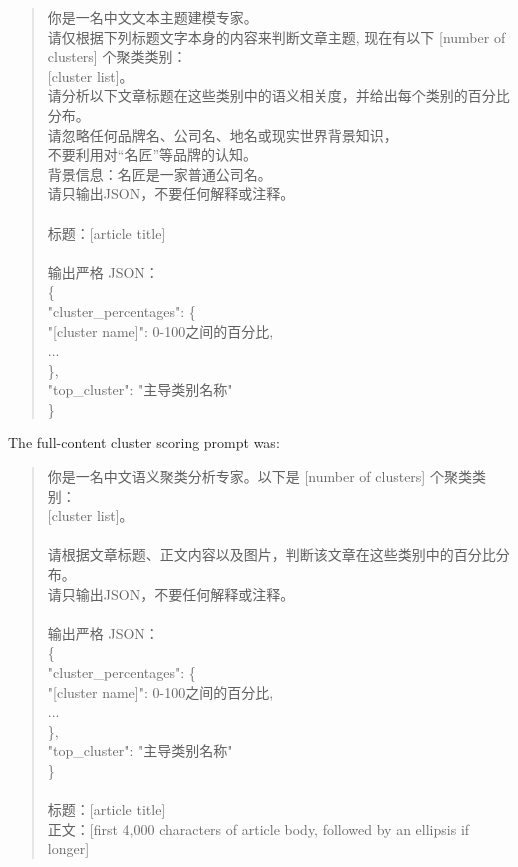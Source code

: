 \begin{quote}
\small
{}
{\cjkfont
你是一名中文文本主题建模专家。\\
请仅根据下列标题文字本身的内容来判断文章主题, 现在有以下 [number of clusters] 个聚类类别：\\
{[cluster list]}。\\
请分析以下文章标题在这些类别中的语义相关度，并给出每个类别的百分比分布。\\
请忽略任何品牌名、公司名、地名或现实世界背景知识，\\
不要利用对“名匠”等品牌的认知。\\
背景信息：名匠是一家普通公司名。\\
请只输出JSON，不要任何解释或注释。\\
\\
标题：[article title]\\
\\
输出严格 JSON：\\
\{\\
\quad "cluster\_percentages": \{\\
\quad\quad "[cluster name]": 0-100之间的百分比,\\
\quad\quad ...\\
\quad \},\\
\quad "top\_cluster": "主导类别名称"\\
\}
}
\end{quote}

The full-content cluster scoring prompt was:

\begin{quote}
\small
{}
{\cjkfont
你是一名中文语义聚类分析专家。以下是 [number of clusters] 个聚类类别：\\
{[cluster list]}。\\
\\
请根据文章标题、正文内容以及图片，判断该文章在这些类别中的百分比分布。\\
请只输出JSON，不要任何解释或注释。\\
\\
输出严格 JSON：\\
\{\\
\quad "cluster\_percentages": \{\\
\quad\quad "[cluster name]": 0-100之间的百分比,\\
\quad\quad ...\\
\quad \},\\
\quad "top\_cluster": "主导类别名称"\\
\}\\
\\
标题：[article title]\\
正文：[first 4,000 characters of article body, followed by an ellipsis if longer]
}
\end{quote}

